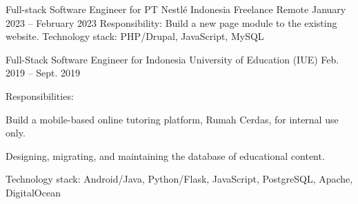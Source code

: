 \begin{cventries}

\cventry
{Full-stack Software Engineer for PT Nestlé Indonesia} %
{Freelance} %
{Remote} %
{January 2023 -- February 2023} %
{ %
Responsibility: Build a new page module to the existing website.
\linebreak
Technology stack: PHP/Drupal, JavaScript, MySQL
}




\cventry
{Full-Stack Software Engineer for Indonesia University of Education (IUE)} %
{} %
{} %
{Feb. 2019 -- Sept. 2019} %
{ %
Responsibilities:
\vspace{5mm}
\begin{cvitems}
\item {Build a mobile-based online tutoring platform, Rumah Cerdas, for internal use only.}
\item {Designing, migrating, and maintaining the database of educational content.}
\end{cvitems}
\vspace{4mm}
Technology stack: Android/Java, Python/Flask, JavaScript, PostgreSQL, Apache, DigitalOcean
}



\end{cventries}
